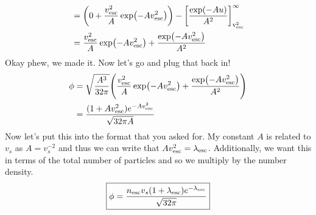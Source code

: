 \documentclass[12pt, letterpaper, twoside]{article}
\begin{document}
{\begin{align}
        &= \qty(0 + \frac{v_{\rm esc}^2}{A} \exp(- A v_{\rm esc}^2)) - \qty[\frac{\exp(- A u)}{A^2}]_{\rm v_{\rm esc}^2}^{\infty} \\
        &= \frac{v_{\rm esc}^2}{A} \exp(- A v_{\rm esc}^2) + \frac{\exp(- A v_{\rm esc}^2)}{A^2}
    \end{align}
    Okay phew, we made it. Now let's go and plug that back in!
    \begin{align}
        \phi &= \sqrt{\frac{A^3}{32 \pi}} \qty( \frac{v_{\rm esc}^2}{A} \exp(- A v_{\rm esc}^2) + \frac{\exp(- A v_{\rm esc}^2)}{A^2} ) \\
             &= \frac{(1 + A v_{\rm esc}^2) e^{- A v_{\rm esc}^2}}{\sqrt{32 \pi A}}
    \end{align}
    Now let's put this into the format that you asked for. My constant $A$ is related to $v_s$ as $A = v_s^{-2}$ and thus we can write that $A v_{\rm esc}^2 = \lambda_{\rm esc}$. Additionally, we want this in terms of the total number of particles and so we multiply by the number density.
    \begin{equation}
        \boxed{ \phi = \frac{n_{\rm esc} v_s (1 + \lambda_{\rm esc}) e^{- \lambda_{\rm esc}}}{\sqrt{32 \pi}} }
    \end{equation}
}
\end{document}
